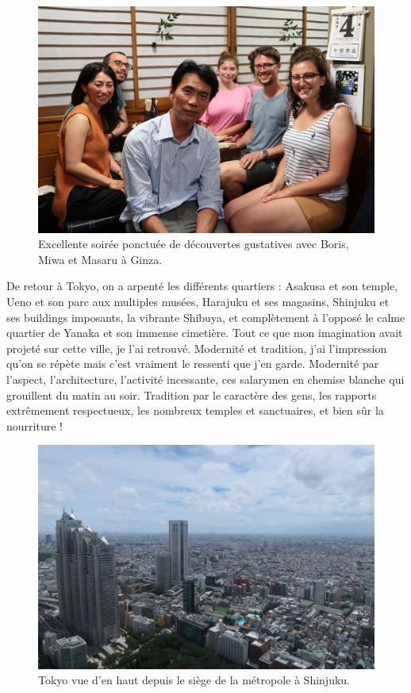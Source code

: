 \begin{figure}
\centering
\includegraphics{images/20180710_boris.JPG}
\caption{Excellente soirée ponctuée de découvertes gustatives avec
Boris, Miwa et Masaru à Ginza.}
\end{figure}

De retour à Tokyo, on a arpenté les différents quartiers : Asakusa et
son temple, Ueno et son parc aux multiples musées, Harajuku et ses
magasins, Shinjuku et ses buildings imposants, la vibrante Shibuya, et
complètement à l'opposé le calme quartier de Yanaka et son immense
cimetière. Tout ce que mon imagination avait projeté sur cette ville, je
l'ai retrouvé. Modernité et tradition, j'ai l'impression qu'on se répète
mais c'est vraiment le ressenti que j'en garde. Modernité par l'aspect,
l'architecture, l'activité incessante, ces salarymen en chemise blanche
qui grouillent du matin au soir. Tradition par le caractère des gens,
les rapports extrêmement respectueux, les nombreux temples et
sanctuaires, et bien sûr la nourriture !

\begin{figure}
\centering
\includegraphics{images/20180710_shinjuku.JPG}
\caption{Tokyo vue d'en haut depuis le siège de la métropole à
Shinjuku.}
\end{figure}

